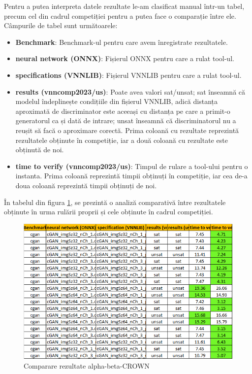 \hspace{0.5 cm}
Pentru a putea interpreta datele rezultate le-am clasificat manual într-un tabel, precum cel din cadrul competiției pentru a putea face o comparație între ele. Câmpurile de tabel sunt următoarele:
\begin{itemize}
    \item \textbf{Benchmark}: Benchmark-ul pentru care avem înregistrate rezultatele.
    \item \textbf{neural network (ONNX)}: Fișierul ONNX pentru care a rulat tool-ul.
    \item \textbf{specifications (VNNLIB)}: Fișierul VNNLIB pentru care a rulat tool-ul.
    \item \textbf{results (vnncomp2023/us)}: Poate avea valori sat/unsat; sat înseamnă că modelul îndeplinește condițiile din fișierul VNNLIB, adică distanța aproximată de discriminator este aceeași cu distanța pe care a primit-o generatorul ca și dată de intrare; unsat înseamnă că discriminatorul nu a reușit să facă o aproximare corectă.
    Prima coloană cu rezultate reprezintă rezultatele obținute în competiție, iar a două coloană cu rezultate este obținută de noi.
    \item \textbf{time to verify (vnncomp2023/us)}: Timpul de rulare a tool-ului pentru o instanta. Prima coloană reprezintă timpii obținuți în competiție, iar cea de-a doua coloană reprezintă timpii obținuți de noi.
\end{itemize}

În tabelul din figura \ref{fig:image1}, se prezintă o analiză comparativă între rezultatele obținute în urma rulării proprii și cele obținute în cadrul competiției.

\begin{figure}[h]
\centering 
\includegraphics[width=0.8\linewidth]{imagini/interpretare rezultate/abC_comp_vs_us.png}
\caption{Comparare rezultate alpha-beta-CROWN}
\label{fig:image1} 
\end{figure}
\

